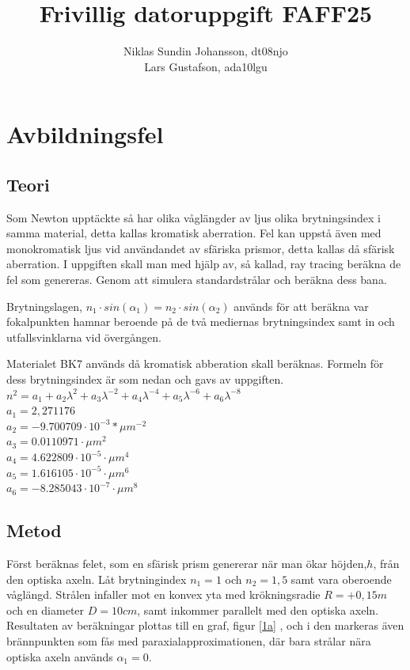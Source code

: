 \documentclass[12pt]{article}
\title{Frivillig datoruppgift FAFF25}
\author{Niklas Sundin Johansson, dt08njo\\Lars Gustafson, ada10lgu }
\begin{document}
\maketitle

\section{Avbildningsfel}

\subsection{Teori}
Som Newton upptäckte så har olika våglängder av ljus olika brytningsindex i samma material, detta kallas kromatisk aberration. Fel kan uppstå även med monokromatisk ljus vid användandet av sfäriska prismor, detta kallas då sfärisk aberration. I uppgiften skall man med hjälp av, så kallad, ray tracing beräkna de fel som genereras. Genom att simulera standardstrålar och beräkna dess bana.  

Brytningslagen, $n_1 \cdot sin(\alpha _1) = n_2 \cdot sin(\alpha _2) $ används för att beräkna var fokalpunkten hamnar beroende på de två mediernas brytningsindex samt in och utfallsvinklarna vid övergången. 

Materialet BK7 används då kromatisk abberation skall beräknas. Formeln för dess brytningsindex är som nedan och gavs av uppgiften.\\
$n^2 = a_1 + a_2 \lambda^2 + a_3 \lambda^{-2}+a_4 \lambda^{-4}+a_5 \lambda^{-6}+a_6\lambda^{-8}$\\
$a_1= 2,271176$\\
$a_2 = -9.700709 \cdot 10^{-3}*\mu m^{-2}$\\
$a_3 = 0.0110971 \cdot \mu m^2$\\
$a_4 = 4.622809 \cdot 10^{-5} \cdot \mu m^4$\\
$a_5 = 1.616105 \cdot 10^{-5} \cdot \mu m^6$\\
$a_6 = -8.285043 \cdot 10^{-7} \cdot \mu m^8$

\subsection{Metod}
Först beräknas felet, som en sfärisk prism genererar när man ökar höjden,$h$, från den optiska axeln. Låt brytningindex $n_1 = 1$ och $n_2 = 1,5$ samt vara oberoende våglängd. Strålen infaller mot en konvex yta med krökningsradie $R = +0,15m$ och en diameter $D = 10cm$, samt inkommer parallelt med den optiska axeln. 
Resultaten av beräkningar plottas till en graf, figur \ref{1a} , och i den markeras även brännpunkten som fås med paraxialapproximationen, där bara strålar nära optiska axeln används $\alpha_1 = 0$.
\end{document}
